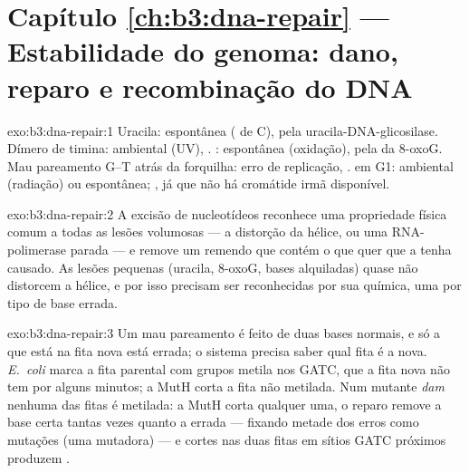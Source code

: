\section*{Capítulo \ref{ch:b3:dna-repair} --- Estabilidade do genoma: dano, reparo e recombinação do DNA}

\begin{solution}{exo:b3:dna-repair:1}
Uracila: espontânea ( de C), 
pela uracila-DNA-glicosilase. Dímero de timina: ambiental (UV), . : espontânea (oxidação),
 pela  da 8-oxoG. Mau pareamento
G--T atrás da forquilha: erro de replicação, .
 em G1: ambiental (radiação) ou espontânea; , já que não há cromátide irmã
disponível.
\end{solution}

\begin{solution}{exo:b3:dna-repair:2}
A excisão de nucleotídeos reconhece uma propriedade física comum a
todas as lesões volumosas --- a distorção da hélice, ou uma
RNA-polimerase parada --- e remove um remendo que contém o que quer
que a tenha causado. As lesões pequenas (uracila, 8-oxoG, bases
alquiladas) quase não distorcem a hélice, e por isso precisam ser
reconhecidas por sua química, uma  por tipo de base errada.
\end{solution}

\begin{solution}{exo:b3:dna-repair:3}
Um mau pareamento é feito de duas bases normais, e só a que está na
fita nova está errada; o sistema precisa saber qual fita é a nova.
\emph{E.~coli} marca a fita parental com grupos metila nos GATC, que a
fita nova não tem por alguns minutos; a MutH corta a fita não metilada.
Num mutante \emph{dam} nenhuma das fitas é metilada: a MutH corta
qualquer uma, o reparo remove a base certa tantas vezes quanto a
errada --- fixando metade dos erros como mutações (uma mutadora) --- e
cortes nas duas fitas em sítios GATC próximos produzem .
\end{solution}

